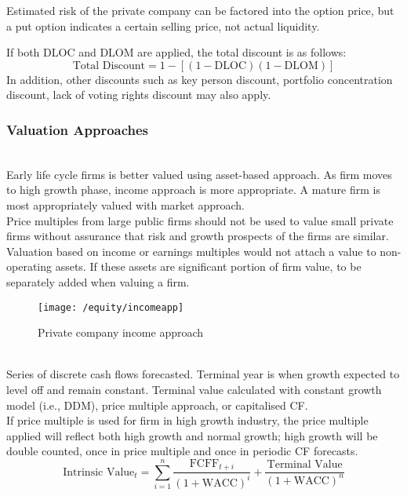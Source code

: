 \begin{remark}
\begin{enumerate}[label=\roman*.]
\begin{enumerate}[label=\arabic*.]
Estimated risk of the private company can be factored into the option price, but a put option indicates a certain selling price, not actual liquidity.
\end{enumerate}
\end{enumerate}
If both DLOC and DLOM are applied, the total discount is as follows:
\begin{equation}
\text{Total Discount} = 1 - \left[(1-\text{DLOC})(1-\text{DLOM})\right] \nonumber
\end{equation}
In addition, other discounts such as key person discount, portfolio concentration discount, lack of voting rights discount may also apply.
\end{remark}

\subsubsection{Valuation Approaches}

\begin{remark} \\
Early life cycle firms is better valued using asset-based approach. As firm moves to high growth phase, income approach is more appropriate. A mature firm is most appropriately valued with market approach.\\
Price multiples from large public firms should not be used to value small private firms without assurance that risk and growth prospects of the firms are similar.\\
Valuation based on income or earnings multiples would not attach a value to non-operating assets. If these assets are significant portion of firm value, to be separately added when valuing a firm.
\end{remark}

\begin{figure}[H]
\centering
\texttt{[image: /equity/incomeapp]}
\caption{Private company income approach}
\end{figure}

\begin{method} \\
Series of discrete cash flows forecasted. Terminal year is when growth expected to level off and remain constant. Terminal value calculated with constant growth model (i.e., DDM), price multiple approach, or capitalised CF.\\
If price multiple is used for firm in high growth industry, the price multiple applied will reflect both high growth and normal growth; high growth will be double counted, once in price multiple and once in periodic CF forecasts.
\begin{equation}
\text{Intrinsic Value}_t = \sum\limits_{i=1}^n \frac{\text{FCFF}_{t+i}}{(1+\text{WACC})^i} + \frac{\text{Terminal Value}}{(1 + \text{WACC})^n} \nonumber
\end{equation}
\end{method}

